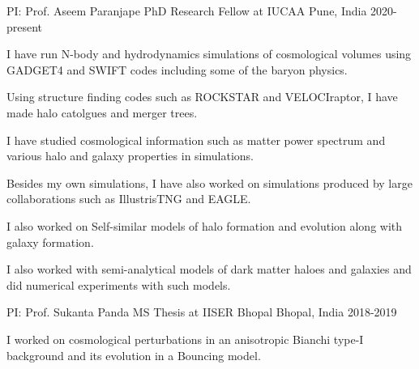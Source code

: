 \begin{cventries}

{
\cventry
{PI: Prof. Aseem Paranjape} %
{PhD Research Fellow at IUCAA} %
{Pune, India} %
{2020-present} %
{ %
\begin{cvitems}
\item {I have run N-body and hydrodynamics simulations of cosmological volumes using GADGET4 and SWIFT codes including some of the baryon physics.}
\item {Using structure finding codes such as ROCKSTAR and VELOCIraptor, I have made halo catolgues and merger trees.}
\item {I have studied cosmological information such as matter power spectrum and various halo and galaxy properties in simulations.}
\item {Besides my own simulations, I have also worked on simulations produced by large collaborations such as IllustrisTNG and EAGLE.}
\item {I also worked on Self-similar models of halo formation and evolution along with galaxy formation.}
\item {I also worked with semi-analytical models of dark matter haloes and galaxies and did numerical experiments with such models.}
\end{cvitems}
}
}


{
\cventry
{PI: Prof. Sukanta Panda} %
{MS Thesis at IISER Bhopal} %
{Bhopal, India} %
{2018-2019} %
{ %
\begin{cvitems}
\item {I worked on cosmological perturbations in an anisotropic Bianchi type-I background and its evolution in a Bouncing model.}
\end{cvitems}
}
}

\end{cventries}



